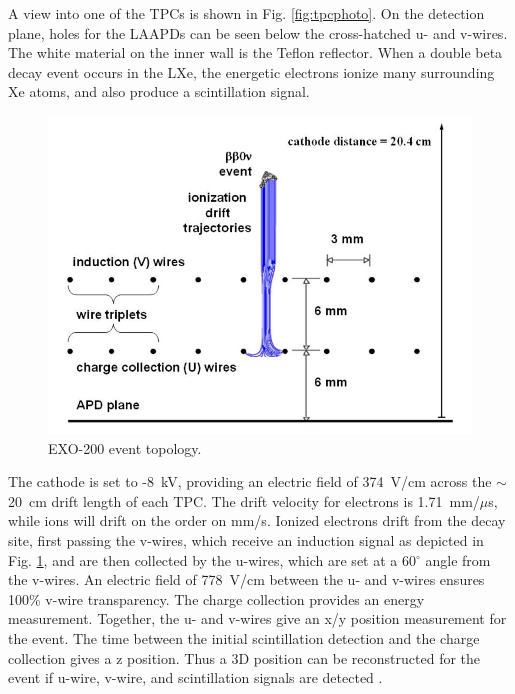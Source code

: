 A view into one of the TPCs is shown in Fig. \ref{fig:tpcphoto}.  On the detection plane, holes for the LAAPDs can be seen below the cross-hatched u- and v-wires.  The white material on the inner wall is the Teflon reflector.  When a double beta decay event occurs in the LXe, the energetic electrons ionize many surrounding Xe atoms, and also produce a scintillation signal.  %

\begin{figure} %
	\centering
	\includegraphics[width=.7\textwidth]{figures/anodecathodedriftcharges.png}
	\caption{EXO-200 event topology.  \cite{EXO200instrumentationPart1}}
\label{fig:detectionplane}
\end{figure}

The cathode is set to -8~kV, providing an electric field of 374~V/cm across the $\sim$20~cm drift length of each TPC.  The drift velocity for electrons is 1.71~mm/$\mu$s, while ions will drift on the order on mm/s.  Ionized electrons drift from the decay site, first passing the v-wires, which receive an induction signal as depicted in Fig. \ref{fig:detectionplane}, and are then collected by the u-wires, which are set at a 60$^\circ$ angle from the v-wires.  An electric field of 778~V/cm between the u- and v-wires ensures 100\% v-wire transparency.  The charge collection provides an energy measurement.  Together, the u- and v-wires give an x/y position measurement for the event.  The time between the initial scintillation detection and the charge collection gives a z position.  Thus a 3D position can be reconstructed for the event if u-wire, v-wire, and scintillation signals are detected \cite{EXO200TwoNuLong}.


